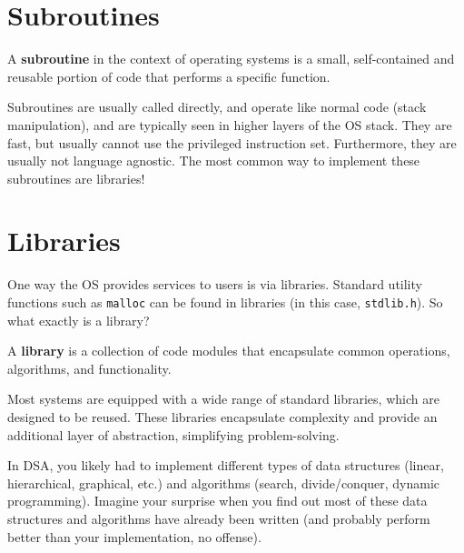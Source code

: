 \documentclass{report}
\begin{document}
\section{Subroutines}
\begin{tcolorbox}[title=Definition: Subroutine]
  A \textbf{subroutine} in the context of operating systems is a small, self-contained and reusable
  portion of code that performs a specific function.
\end{tcolorbox}

Subroutines are usually called directly, and operate like normal code (stack manipulation), and are
typically seen in higher layers of the OS stack. They are fast, but usually cannot use the
privileged instruction set. Furthermore, they are usually not language agnostic. The most common way
to implement these subroutines are libraries!

\section{Libraries}
One way the OS provides services to users is via libraries. Standard utility functions such as
\texttt{malloc} can be found in libraries (in this case, \texttt{stdlib.h}). So what exactly is a
library?

\begin{tcolorbox}[title=Definition: Library]
  A \textbf{library} is a collection of code modules that encapsulate common operations, algorithms,
  and functionality. 
\end{tcolorbox}

\begin{tcolorbox}[colback=violet!5!white,colframe=violet,title=Abstraction: Libraries] 
  Most systems are equipped with a wide range of standard libraries, which are designed to be
  reused. These libraries encapsulate complexity and provide an additional layer of abstraction,
  simplifying problem-solving. 
\end{tcolorbox}

\begin{tcolorbox}[colback=blue!5!white,colframe=black!75!blue,title=Example: DSA Doozy] 
  In DSA, you likely had to implement different types of data structures (linear, hierarchical,
  graphical, etc.) and algorithms (search, divide/conquer, dynamic programming). Imagine your
  surprise when you find out most of these data structures and algorithms have already been written
  (and probably perform better than your implementation, no offense).
\end{tcolorbox}
\end{document}
